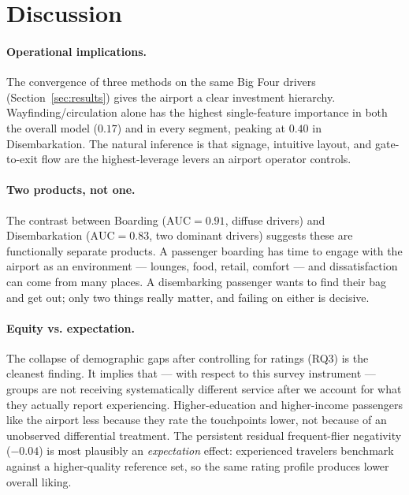 \documentclass[11pt]{article}
\begin{document}
\section{Discussion}
\label{sec:discussion}

\paragraph{Operational implications.} The convergence of three methods on the same Big Four drivers (Section~\ref{sec:results}) gives the airport a clear investment hierarchy. Wayfinding/circulation alone has the highest single-feature importance in both the overall model ($0.17$) and in every segment, peaking at $0.40$ in Disembarkation. The natural inference is that signage, intuitive layout, and gate-to-exit flow are the highest-leverage levers an airport operator controls.

\paragraph{Two products, not one.} The contrast between Boarding ($\mathrm{AUC}=0.91$, diffuse drivers) and Disembarkation ($\mathrm{AUC}=0.83$, two dominant drivers) suggests these are functionally separate products. A passenger boarding has time to engage with the airport as an environment --- lounges, food, retail, comfort --- and dissatisfaction can come from many places. A disembarking passenger wants to find their bag and get out; only two things really matter, and failing on either is decisive.

\paragraph{Equity vs. expectation.} The collapse of demographic gaps after controlling for ratings (RQ3) is the cleanest finding. It implies that --- with respect to this survey instrument --- groups are not receiving systematically different service after we account for what they actually report experiencing. Higher-education and higher-income passengers like the airport less because they rate the touchpoints lower, not because of an unobserved differential treatment. The persistent residual frequent-flier negativity ($-0.04$) is most plausibly an \emph{expectation} effect: experienced travelers benchmark against a higher-quality reference set, so the same rating profile produces lower overall liking.
\end{document}
